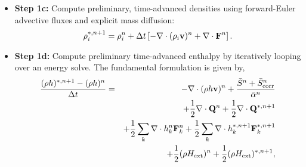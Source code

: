 \documentclass[final]{siamltex}
\def\Fb {{\bf F}}
\def\gb {{\bf g}}
\def\Qb {{\bf Q}}
\def\vb {{\bf v}}
\def\deltab {\boldsymbol{\delta}}
\def\Hext {H_{\rm ext}}
\def\half   {\frac{1}{2}}
\begin{document}
\begin{itemize}
{They are more to help me with implementation.
We could mention that we do it, and just cite the binary paper.}
In practice, we solve for a modified increment to the velocity field, $\deltab\vb$.  In particular,
we split the updated velocity into
$\vb^{*,n+1} = \bar{\vb}^n + \deltab\vb$, where $\bar{\vb}^n$ is the velocity at $t^n$, but with modified boundary
conditions consistent with $\vb^{*,n+1}$, and $\deltab\vb$ has homogeneous boundary conditions of the same type (Dirichlet or Neumann).
We also split $\pi^{*,n+1} = \pi^n + \delta\pi$ in the same way.  Rewriting the Stokes system above we have:
\begin{eqnarray}
\left(\frac{\rho^n}{\Delta t} - \half\mathcal{A}_0^n\right)\deltab\vb + \nabla\delta\pi &=& \frac{\rho^{n-1}\vb^{n-1} - \rho^n\bar{\vb}^{n-1}}{\Delta t} - \nabla\pi^{n-1}\nonumber\\
&&\hspace{-1.5in} - \half\left[\nabla\cdot(\rho\vb\vb)^{n-1} + \nabla\cdot(\rho\vb\vb)^{*,n}\right] + \half(\mathcal{A}_0^{n-1}\vb^{n-1}+\mathcal{A}_0^n\bar{\vb}^{n-1}) + \half(\rho^{n-1} + \rho^n)\gb,\nonumber\\
\end{eqnarray}
\begin{equation}
-\nabla\cdot\delta\vb = \nabla\cdot\bar{\vb}^{n-1} - \left[\delta S^n + \delta S_{\rm corr}^n - \delta\alpha^n\left(\frac{\bar{S}^n + \bar{S}_{\rm corr}^n}{\bar{\alpha}^n}\right)\right].
\end{equation}
\item {\bf Step 1c:} Compute preliminary, time-advanced densities using forward-Euler advective fluxes
and explicit mass diffusion:
\begin{equation}
\rho_i^{*,n+1} = \rho_i^n + \Delta t\left[-\nabla\cdot(\rho_i\vb)^n + \nabla\cdot\Fb^n\right].
\end{equation}
\item {\bf Step 1d:} Compute preliminary time-advanced enthalpy by iteratively looping over an energy solve.
The fundamental formulation is given by,
\begin{eqnarray}
\frac{(\rho h)^{*,n+1} - (\rho h)^n}{\Delta t} &=& -\nabla\cdot(\rho h\vb)^n + \frac{\bar{S}^n + \bar{S}_{\rm corr}^n}{\bar{\alpha}^n}\nonumber\\
&&+ \half\nabla\cdot\Qb^n + \half\nabla\cdot\Qb^{*,n+1}\nonumber\\
&&+ \half\sum_k\nabla\cdot h_k^n\Fb_k^n + \half\sum_k\nabla\cdot h_k^{*,n+1}\Fb_k^{*,n+1}\nonumber\\
&&+ \half(\rho\Hext)^n + \half(\rho\Hext)^{*,n+1},

\end{eqnarray}
\end{itemize}
\end{document}
